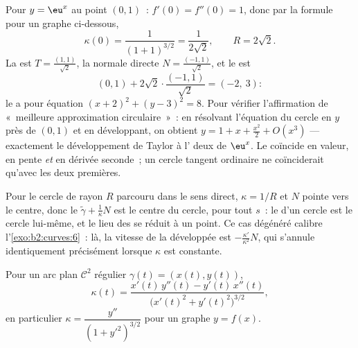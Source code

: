 \begin{example}\label{ex:b2:curves:oscexp}
Pour $y = \eu^x$ au point $(0, 1)$~: $f'(0) = f''(0) = 1$,
donc par la formule pour un graphe ci-dessous,
\[
\kappa(0) = \frac{1}{(1 + 1)^{3/2}} = \frac1{2\sqrt2},
\qquad R = 2\sqrt2 .
\]
La   est $T = \frac{(1, 1)}{\sqrt2}$, la
normale directe $N = \frac{(-1, 1)}{\sqrt2}$, et le  est
\[
(0, 1) + 2\sqrt2\cdot\frac{(-1, 1)}{\sqrt2} = (-2,\ 3) :
\]
le  a pour équation $(x + 2)^2 + (y - 3)^2 =
8$. Pour vérifier l'affirmation de «~meilleure approximation
circulaire~»~: en résolvant l'équation du cercle en $y$ près
de $(0,1)$ et en développant, on obtient $y = 1 + x +
\frac{x^2}2 + O(x^3)$ ---
exactement le développement de Taylor à l' deux de
$\eu^x$. Le  coïncide en valeur, en pente
\emph{et} en dérivée seconde~; un cercle tangent ordinaire ne
coïnciderait qu'avec les deux premières.
\end{example}

\begin{example}\label{ex:b2:curves:circleevolute}
Pour le cercle de rayon $R$ parcouru dans le sens direct,
$\kappa = 1/R$ et $N$ pointe vers le centre, donc le
 $\tilde\gamma + \frac1\kappa N$ est le
centre du cercle, pour tout $s$~: le 
d'un cercle est le cercle lui-même, et le lieu des  se réduit à un point. Ce cas dégénéré
calibre l'\cref{exo:b2:curves:6}~: là, la vitesse de la
développée est $-\frac{\kappa'}{\kappa^2}N$, qui s'annule
identiquement précisément lorsque $\kappa$ est constante.
\end{example}

\begin{proposition}\label{prop:b2:curves:kappaformula}
Pour un arc plan $\mathcal{C}^2$ régulier $\gamma(t) = (x(t), y(t))$,
\[
\kappa(t)
= \frac{x'(t)\,y''(t) - y'(t)\,x''(t)}
       {\bigl(x'(t)^2 + y'(t)^2\bigr)^{3/2}} ,
\]
en particulier $\kappa = \dfrac{y''}{(1 + y'^2)^{3/2}}$ pour un
graphe $y = f(x)$.
\end{proposition}

